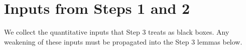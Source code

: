 
\begin{abstract}
Step 2 says that on each rich good fiber $\Fxy$, the cut $S$ is close to a monotone
staircase in the local grid coordinates. Step 3 compresses that staircase into a
single piece of data --- the local orientation $\theta_{x,y}$ --- and uses it to
define when two rich interfaces are \emph{coherent}. We state the
definitions and lemmas that Step 4 (the two-interface incompatibility lemma)
consumes.
\end{abstract}


\section{Inputs from Steps 1 and 2}\label{sec:inputs}

We collect the quantitative inputs that Step 3 treats as black boxes. Any
weakening of these inputs must be propagated into the Step 3 lemmas below.

